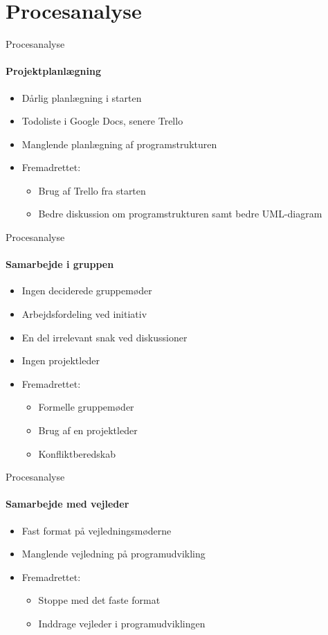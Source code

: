 \section{Procesanalyse}
\begin{frame}{Procesanalyse}
	\framesubtitle{Projektplanlægning}
	
	\begin{itemize}
		\item Dårlig planlægning i starten
		\item Todoliste i Google Docs, senere Trello
		\item Manglende planlægning af programstrukturen
		\item Fremadrettet:
		\begin{itemize}
			\item Brug af Trello fra starten
			\item Bedre diskussion om programstrukturen samt bedre UML-diagram
		\end{itemize}
	\end{itemize}

\end{frame}

\begin{frame}{Procesanalyse}
	\framesubtitle{Samarbejde i gruppen}
	
	\begin{itemize}
		\item Ingen deciderede gruppemøder
		\item Arbejdsfordeling ved initiativ
		\item En del irrelevant snak ved diskussioner
		\item Ingen projektleder
		\item Fremadrettet:
		\begin{itemize}
			\item Formelle gruppemøder
			\item Brug af en projektleder
			\item Konfliktberedskab
		\end{itemize}
	\end{itemize}

\end{frame}

\begin{frame}{Procesanalyse}
	\framesubtitle{Samarbejde med vejleder}
	
	\begin{itemize}
		\item Fast format på vejledningsmøderne
		\item Manglende vejledning på programudvikling
		\item Fremadrettet:
		\begin{itemize}
			\item Stoppe med det faste format
			\item Inddrage vejleder i programudviklingen
		\end{itemize}
	\end{itemize}

\end{frame}

